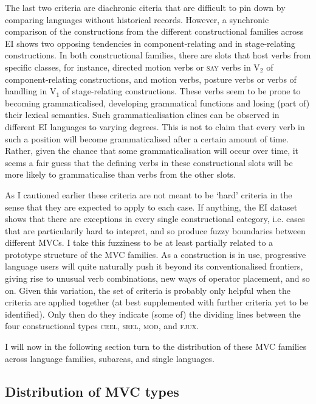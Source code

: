 The last two criteria are diachronic citeria that are difficult to pin down by comparing languages without historical records. However, a synchronic comparison of the constructions from the different constructional families across EI shows two opposing tendencies in component-relating and in stage-relating constructions. In both constructional families, there are slots that host verbs from specific classes, for instance, directed motion verbs or \textsc{say} verbs in V$_2$ of component-relating constructions, and motion verbs, posture verbs or verbs of handling in V$_1$ of stage-relating constructions. These verbs seem to be prone to becoming grammaticalised, developing grammatical functions and losing (part of) their lexical semantics. Such grammaticalisation clines can be observed in different EI languages to varying degrees. This is not to claim that every verb in such a position will become grammaticalised after a certain amount of time. Rather, given the chance that some grammaticalisation will occur over time, it seems a fair guess that the defining verbs in these constructional slots will be more likely to grammaticalise than verbs from the other slots.

As I cautioned earlier these criteria are not meant to be `hard' criteria in the sense that they are expected to apply to each case. If anything, the EI dataset shows that there are exceptions in every single constructional category, i.e. cases that are particularily hard to intepret, and so produce fuzzy boundaries between different MVCs. I take this fuzziness to be at least partially related to a prototype structure of the MVC families. As a construction is in use, progressive language users will quite naturally push it beyond its conventionalised frontiers, giving rise to unusual verb combinations, new ways of operator placement, and so on. Given this variation, the set of criteria is probably only helpful when the criteria are applied together (at best supplemented with further criteria yet to be identified). Only then do they indicate (some of) the dividing lines between the four constructional types \textsc{crel}, \textsc{srel}, \textsc{mod}, and \textsc{fjux}. 

I will now in the following section turn to the distribution of these MVC families across language families, subareas, and single languages.

\subsection{Distribution of MVC types}\label{sec:dist_types}

